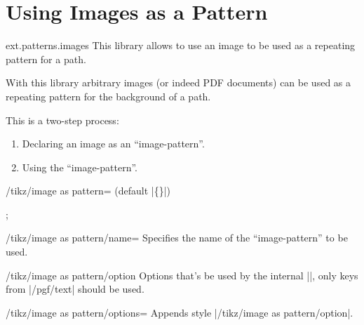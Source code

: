 %
%
%
\clearpage
\section{Using Images as a Pattern}
\label{library:patterns.images}

\begin{tikzlibrary}{ext.patterns.images}
  This library allows to use an image to be used as a repeating pattern for a path.
\end{tikzlibrary}

With this library arbitrary images (or indeed PDF documents) can be used as
a repeating pattern for the background of a path.

This is a two-step process:
\begin{enumerate}
\item Declaring an image as an ``image-pattern''.
\item Using the ``image-pattern''.
\end{enumerate}

\begin{command}{\pgfsetupimageaspattern{}}
\end{command}

\begin{key}{/tikz/image as pattern= (default |\{\}|)}

\begin{codeexample}[preamble=\usetikzlibrary{ext.patterns.images}]
\tikz \node[star, minimum size=3cm, draw,
  image as pattern={name=grid,options={left, bottom, y=-.5cm, rotate=45}}] {};
\end{codeexample}
\end{key}

\begin{key}{/tikz/image as pattern/name=}
Specifies the name of the ``image-pattern'' to be used.
\end{key}

\begin{stylekey}{/tikz/image as pattern/option}
Options that's be used by the internal |\pgftext|,
only keys from |/pgf/text| should be used.
\end{stylekey}

\begin{stylekey}{/tikz/image as pattern/options=}
Appends style |/tikz/image as pattern/option|.
\end{stylekey}